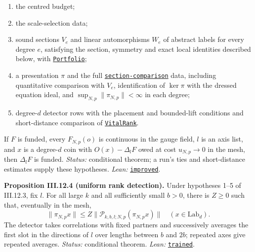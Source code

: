 \documentclass[
  letterpaper,
  11pt]{article}
\providecommand{\tightlist}{%
  \setlength{\itemsep}{0pt}\setlength{\parskip}{0pt}}
\begin{document}
\begin{enumerate}
\def\labelenumi{\arabic{enumi}.}
\tightlist
\item
  the centred budget;
\item
  the scale-selection data;
\item
  sound sections \(V_e\) and linear automorphisms \(W_e\) of abstract
  labels for every degree \(e\), satisfying the section, symmetry and
  exact local identities described below, with
  \href{https://github.com/yang-mills-group/OpenAI-YM-20261028/blob/3456e5e75cf8d4cd558955a5c7638fba2d68f464/YM/Push/RELAY_MARK/Portfolio.lean\#L51-L58}{\texttt{Portfolio}};
\item
  a presentation \(\pi\) and the full
  \href{https://github.com/yang-mills-group/OpenAI-YM-20261028/blob/3456e5e75cf8d4cd558955a5c7638fba2d68f464/YM/MergeProof/Canopy.lean\#L30-L32}{\texttt{section-comparison}}
  data, including quantitative comparison with \(V_e\), identification
  of \(\ker\pi\) with the dressed equation ideal, and
  \(\sup_{N,p}\|\pi_{N,p}\|<\infty\) in each degree;
\item
  degree-\(d\) detector rows with the placement and bounded-lift
  conditions and short-distance comparison of
  \href{https://github.com/yang-mills-group/OpenAI-YM-20261028/blob/3456e5e75cf8d4cd558955a5c7638fba2d68f464/YM/FullVolume/Maintain.lean\#L49-L52}{\texttt{VitalRank}}.
\end{enumerate}

If \(F\) is funded, every \(F_{N,p}(o)\) is continuous in the gauge
field, \(l\) is an axis list, and \(x\) is a degree-\(d\) coin with
\(O(x)-\Delta_lF\) owed at cost \(u_{N,p}\to0\) in the mesh, then
\(\Delta_lF\) is funded. \emph{Status:} conditional theorem; a run's
ties and short-distance estimates supply these hypotheses. \emph{Lean:}
\href{https://github.com/yang-mills-group/OpenAI-YM-20261028/blob/3456e5e75cf8d4cd558955a5c7638fba2d68f464/YM/FullVolume/Moneys.lean\#L69-L78}{\texttt{improved}}.

\textbf{Proposition III.12.4 (uniform rank detection).} Under hypotheses
1--5 of III.12.3, fix \(l\). For all large \(k\) and all sufficiently
small \(b>0\), there is \(Z\ge0\) such that, eventually in the mesh,
\[\|\pi_{N,p}x\|\le Z\|\mathcal P_{k,b,l;N,p}(\pi_{N,p}x)\|\quad(x\in\mathrm{Lab}_d).\]
The detector takes correlations with fixed partners and successively
averages the first slot in the directions of \(l\) over lengths between
\(b\) and \(2b\); repeated axes give repeated averages. \emph{Status:}
conditional theorem. \emph{Lean:}
\href{https://github.com/yang-mills-group/OpenAI-YM-20261028/blob/3456e5e75cf8d4cd558955a5c7638fba2d68f464/YM/FullVolume/Lit.lean\#L51-L91}{\texttt{trained}}.
\end{document}
